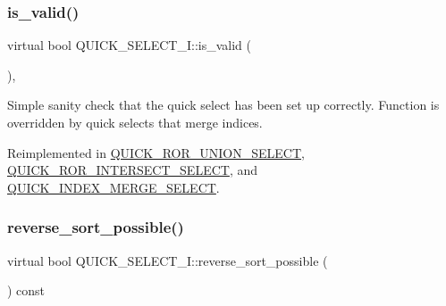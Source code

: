 \mbox{\label{classQUICK__SELECT__I_ae5b342ce5be23d3c7a8d932c1245e0c7}} 
\subsubsection{\texorpdfstring{is\+\_\+valid()}{is\_valid()}}
{\footnotesize\ttfamily virtual bool Q\+U\+I\+C\+K\+\_\+\+S\+E\+L\+E\+C\+T\+\_\+\+I\+::is\+\_\+valid (\begin{DoxyParamCaption}{ }\end{DoxyParamCaption})\hspace{0.3cm}{\ttfamily [inline]}, {\ttfamily [virtual]}}

Simple sanity check that the quick select has been set up correctly. Function is overridden by quick selects that merge indices. 

Reimplemented in \mbox{\hyperlink{classQUICK__ROR__UNION__SELECT_a623fe0d5f8caeb4c5cb2b934cec79394}{Q\+U\+I\+C\+K\+\_\+\+R\+O\+R\+\_\+\+U\+N\+I\+O\+N\+\_\+\+S\+E\+L\+E\+CT}}, \mbox{\hyperlink{classQUICK__ROR__INTERSECT__SELECT_a04eea20e0eba7ff80cd29290cee6c508}{Q\+U\+I\+C\+K\+\_\+\+R\+O\+R\+\_\+\+I\+N\+T\+E\+R\+S\+E\+C\+T\+\_\+\+S\+E\+L\+E\+CT}}, and \mbox{\hyperlink{classQUICK__INDEX__MERGE__SELECT_a1feb668246b5f37b92cf069ac544337b}{Q\+U\+I\+C\+K\+\_\+\+I\+N\+D\+E\+X\+\_\+\+M\+E\+R\+G\+E\+\_\+\+S\+E\+L\+E\+CT}}.

\mbox{\label{classQUICK__SELECT__I_a485c91ca6490bcf1de2eed5a7181a800}} 
\subsubsection{\texorpdfstring{reverse\+\_\+sort\+\_\+possible()}{reverse\_sort\_possible()}}
{\footnotesize\ttfamily virtual bool Q\+U\+I\+C\+K\+\_\+\+S\+E\+L\+E\+C\+T\+\_\+\+I\+::reverse\+\_\+sort\+\_\+possible (\begin{DoxyParamCaption}{ }\end{DoxyParamCaption}) const\hspace{0.3cm}{\ttfamily [pure virtual]}}


